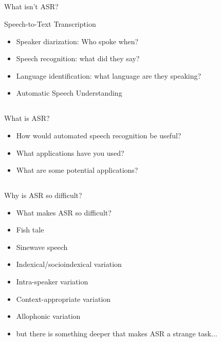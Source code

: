 \documentclass[9pt,xcolor=pdftex,dvipsnames,table]{beamer}
\begin{document}
\subsection{}
\begin{frame}{What isn't ASR?}

{\large Speech-to-Text Transcription }
	\begin{itemize}
		\item Speaker diarization: Who spoke when?
		\item Speech recognition: what did they say?
		\item Language identification: what language are they speaking?
		\item Automatic Speech Understanding
	\end{itemize}
\end{frame}

\subsection{}
\begin{frame}{What is ASR?}

\begin{itemize}
	\item {\Huge How would automated speech recognition be useful?} \\ \pause
	\vspace{.25cm}
	\item {\Huge What applications have you used?} \\ \pause
	\vspace{.25cm}
	\item {\Huge What are some potential applications?}
\end{itemize}

\end{frame}

\subsection{}
\begin{frame}{Why is ASR so difficult?}

\begin{itemize}
	\item {\Huge What makes ASR so difficult?} \\ \pause
\end{itemize}

\begin{itemize}
	\item Fish tale
	\item Sinewave speech
	\item Indexical/socioindexical variation
	\item Intra-speaker variation
	\item Context-appropriate variation
	\item Allophonic variation
	\item but there is something deeper that makes ASR a strange task...
\end{itemize}

\end{frame}
\end{document}
